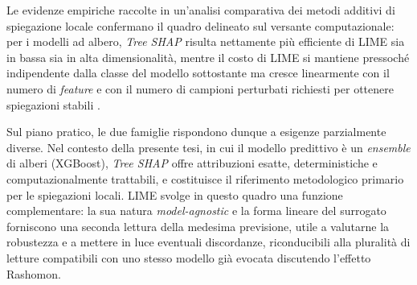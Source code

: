 Le evidenze empiriche raccolte in un'analisi comparativa dei metodi additivi di spiegazione locale confermano il quadro delineato sul versante computazionale: per i modelli ad albero, \textit{Tree SHAP} risulta nettamente più efficiente di LIME sia in bassa sia in alta dimensionalità, mentre il costo di LIME si mantiene pressoché indipendente dalla classe del modello sottostante ma cresce linearmente con il numero di \textit{feature} e con il numero di campioni perturbati richiesti per ottenere spiegazioni stabili \cite{doumard2022comparative}.

Sul piano pratico, le due famiglie rispondono dunque a esigenze parzialmente diverse. Nel contesto della presente tesi, in cui il modello predittivo è un \textit{ensemble} di alberi (XGBoost), \textit{Tree SHAP} offre attribuzioni esatte, deterministiche e computazionalmente trattabili, e costituisce il riferimento metodologico primario per le spiegazioni locali. LIME svolge in questo quadro una funzione complementare: la sua natura \textit{model-agnostic} e la forma lineare del surrogato forniscono una seconda lettura della medesima previsione, utile a valutarne la robustezza e a mettere in luce eventuali discordanze, riconducibili alla pluralità di letture compatibili con uno stesso modello già evocata discutendo l'effetto Rashomon.
